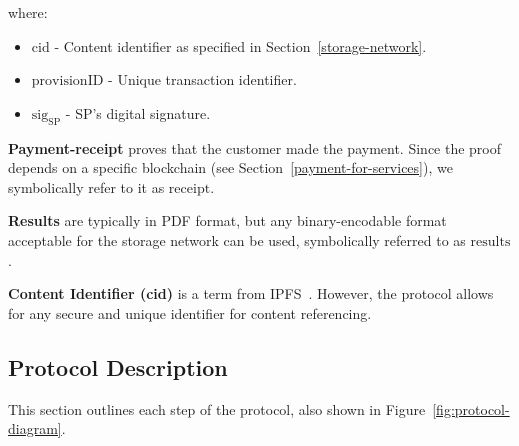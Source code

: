 \documentclass[pdftex,twocolumn,epjc3]{svjour3}
\begin{document}
where:
\begin{itemize}
\item $\mathrm{cid}$ - Content identifier as specified in Section~\ref{storage-network}.
\item $\mathrm{provisionID}$ - Unique transaction identifier.
\item $\mathrm{sig}_\mathrm{SP}$ - SP's digital signature.
\end{itemize}

\noindent \textbf
{Payment-receipt}\label{payment-receipt} proves that the customer made the payment. Since the proof depends on a specific blockchain (see Section~\ref{payment-for-services}), we symbolically refer to it as $\mathrm{receipt}$.

\begin{sloppypar}
\noindent \textbf{Results}\label{results} are typically in PDF format, but any binary-encodable format acceptable for the storage network can be used, symbolically referred to as $\mathrm{results}$.
\end{sloppypar}

\noindent \textbf{Content Identifier (cid)}\label{content-identifier-cid} is a term from IPFS~\cite{ipfsContentIdentifiersCIDs}. However, the protocol allows for any secure and unique identifier for content referencing.

\subsection{Protocol Description}\label{protocol-description}

This section outlines each step of the protocol, also shown in Figure~\ref{fig:protocol-diagram}.
\end{document}

